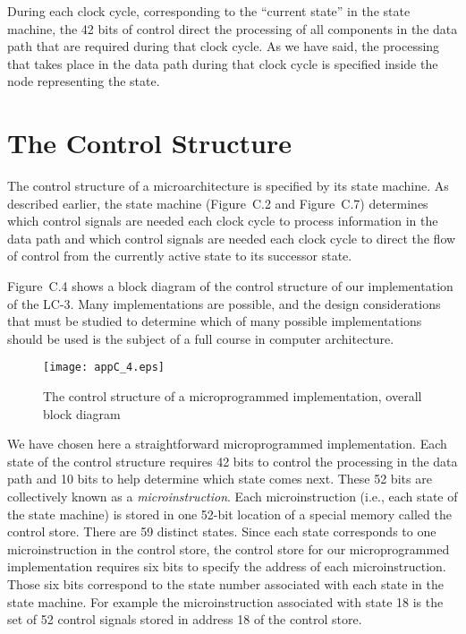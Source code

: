 \documentclass{patt}
\begin{document}
During each clock cycle, corresponding to the ``current state'' in the
state machine, the 42 bits of control direct the processing of all
components in the data path that are required during that clock cycle.
As we have said, the processing that takes place in the data path during 
that clock cycle is specified inside the node representing the
state.

\FloatBarrier
\section{The Control Structure}

The control structure of a microarchitecture is specified by its
state machine.  As described earlier, the state machine
(Figure~C.2 and Figure~C.7) determines which control signals are needed each
clock cycle to process information in the data path and which
control signals are needed each clock cycle to direct the flow of
control from the currently active state to its successor state.
\egroup

Figure~C.4 shows a block diagram of the control structure of our
implementation of the LC-3.  Many implementations are possible, and
the design considerations that must be studied to determine which of
many possible implementations should be used is the subject of a full
course in computer architecture.

\begin{figure}
\centerline{\texttt{[image: appC\_4.eps]}}
\caption{The control structure of a microprogrammed implementation,
  overall block diagram}
\label{fig:microcontrol}
\end{figure}

We have chosen here a straightforward microprogrammed implementation.
Each state of the control structure requires 42 bits to control the
processing in the data path and 10 bits to help determine which state
comes next.  These 52 bits are collectively known as 
a {\em microinstruction}.  Each microinstruction (i.e., each state of the
state machine) is stored in one 52-bit location of a special memory
called the control store.  There are 59 distinct states.  Since each
state corresponds to one microinstruction in the control store, the
control store for our microprogrammed implementation requires six bits
to specify the address of each microinstruction.  Those six bits correspond
to the state number associated with each state in the state machine.  
For example the microinstruction associated with state 18 is the set of
52 control signals stored in address 18 of the control store. 
\end{document}
